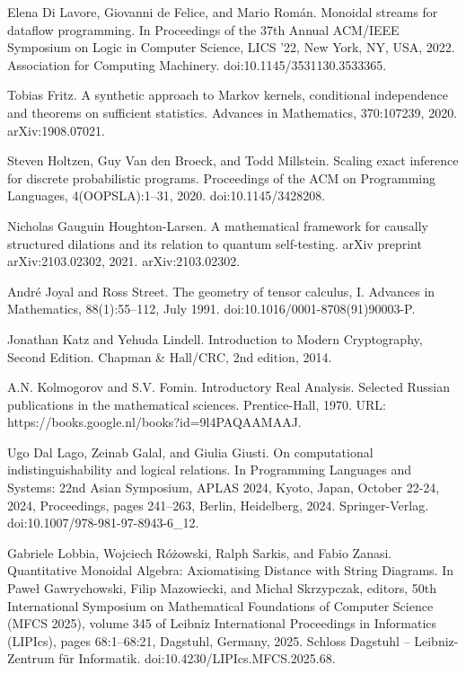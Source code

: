 \par\noindent  [9]  Elena Di Lavore, Giovanni de Felice, and Mario Román.  Monoidal streams for dataflow programming.  In Proceedings of the 37th Annual ACM/IEEE Symposium on Logic in Computer Science, LICS ’22, New York, NY, USA, 2022. Association for Computing Machinery.  doi:10.1145/3531130.3533365.  
 
\par\noindent  [10]  Tobias Fritz.  A synthetic approach to Markov kernels, conditional independence and theorems on sufficient statistics.  Advances in Mathematics, 370:107239, 2020.  arXiv:1908.07021.  
 
\par\noindent  [11]  Steven Holtzen, Guy Van den Broeck, and Todd Millstein.  Scaling exact inference for discrete probabilistic programs.  Proceedings of the ACM on Programming Languages, 4(OOPSLA):1–31, 2020.  doi:10.1145/3428208.  
 
\par\noindent  [12]  Nicholas Gauguin Houghton-Larsen.  A mathematical framework for causally structured dilations and its relation to quantum self-testing.  arXiv preprint arXiv:2103.02302, 2021.  arXiv:2103.02302.  
 
\par\noindent  [13]  André Joyal and Ross Street.  The geometry of tensor calculus, I.  Advances in Mathematics, 88(1):55–112, July 1991.  doi:10.1016/0001-8708(91)90003-P.  
 
\par\noindent  [14]  Jonathan Katz and Yehuda Lindell.  Introduction to Modern Cryptography, Second Edition.  Chapman \& Hall/CRC, 2nd edition, 2014.  
 
\par\noindent  [15]  A.N. Kolmogorov and S.V. Fomin.  Introductory Real Analysis.  Selected Russian publications in the mathematical sciences. Prentice-Hall, 1970.  URL: https://books.google.nl/books?id=9l4PAQAAMAAJ.  
 
\par\noindent  [16]  Ugo Dal Lago, Zeinab Galal, and Giulia Giusti.  On computational indistinguishability and logical relations.  In Programming Languages and Systems: 22nd Asian Symposium, APLAS 2024, Kyoto, Japan, October 22-24, 2024, Proceedings, pages 241–263, Berlin, Heidelberg, 2024. Springer-Verlag.  doi:10.1007/978-981-97-8943-6\_12.  
 
\par\noindent  [17]  Gabriele Lobbia, Wojciech Różowski, Ralph Sarkis, and Fabio Zanasi.  Quantitative Monoidal Algebra: Axiomatising Distance with String Diagrams.  In Paweł Gawrychowski, Filip Mazowiecki, and Michał Skrzypczak, editors, 50th International Symposium on Mathematical Foundations of Computer Science (MFCS 2025), volume 345 of Leibniz International Proceedings in Informatics (LIPIcs), pages 68:1–68:21, Dagstuhl, Germany, 2025. Schloss Dagstuhl – Leibniz-Zentrum für Informatik.  doi:10.4230/LIPIcs.MFCS.2025.68.  
 

